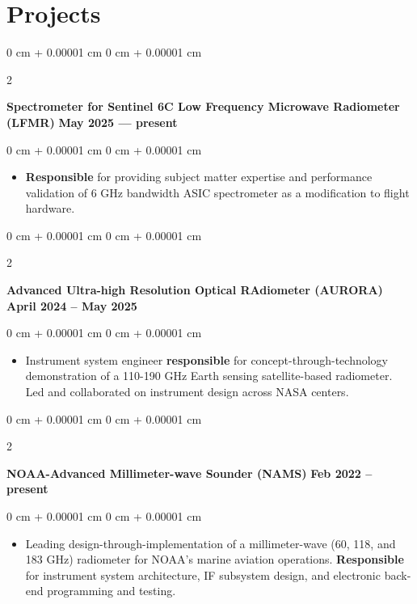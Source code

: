 \documentclass[10pt, letterpaper]{article}
\newenvironment{highlights}{
    \begin{itemize}[
        topsep=0.10 cm,
        parsep=0.10 cm,
        partopsep=0pt,
        itemsep=0pt,
        leftmargin=0 cm + 10pt     
    ]
}{
    \end{itemize}
} %
\newenvironment{onecolentry}{
    \begin{adjustwidth}{
        0 cm + 0.00001 cm
    }{
        0 cm + 0.00001 cm
    }
}{
    \end{adjustwidth}
} %
\newenvironment{twocolentry}[2][]{
    \onecolentry
    \def\secondColumn{#2}
    \setcolumnwidth{\fill, 4.5 cm}
    \begin{paracol}{2}
}{
    \switchcolumn \raggedleft \secondColumn
    \end{paracol}
    \endonecolentry
} %
\begin{document}
    \section{Projects}
       \justifying
        \begin{twocolentry}{
            \textbf{May 2025 --- present}
        }
            \textbf{Spectrometer for Sentinel 6C Low Frequency Microwave Radiometer (LFMR)}\end{twocolentry}

        \vspace{0.20 cm}
        \begin{onecolentry}
            \begin{highlights}
                \item \textbf{Responsible} for providing subject matter expertise and performance validation of 6 GHz bandwidth ASIC spectrometer as a modification to flight hardware.\\
            \end{highlights}
        \end{onecolentry}
        
        \begin{twocolentry}{
            \textbf{April 2024 -- May 2025}
        }
            \textbf{Advanced Ultra-high Resolution Optical RAdiometer (AURORA)}\end{twocolentry}

        \vspace{0.20 cm}
        \begin{onecolentry}
            \begin{highlights}
                \item Instrument system engineer \textbf{responsible} for concept-through-technology demonstration of a 110-190 GHz Earth sensing satellite-based radiometer. Led and collaborated on instrument design across NASA centers.\\
            \end{highlights}
        \end{onecolentry}
        \begin{twocolentry}{
            \textbf{Feb 2022 -- present}
        }
            \textbf{NOAA-Advanced Millimeter-wave Sounder (NAMS)}\end{twocolentry}

        \vspace{0.20 cm}
        \begin{onecolentry}
            \begin{highlights}
                \item Leading design-through-implementation  of a millimeter-wave (60, 118, and 183 GHz) radiometer for NOAA's marine aviation operations. \textbf{Responsible} for instrument system architecture, IF subsystem design, and electronic back-end programming and testing.
            \end{highlights}
        \end{onecolentry}
        \vspace{0.3 cm}
\end{document}
